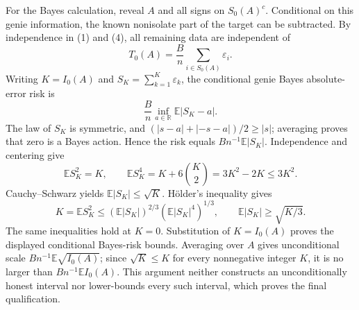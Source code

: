 For the Bayes calculation, reveal \(A\) and all signs on \(S_0(A)^c\).  Conditional on this genie information, the known nonisolate part of the target can be subtracted.  By independence in (1) and (4), all remaining data are independent of
\[
 T_0(A)=\frac Bn\sum_{i\in S_0(A)}\varepsilon_i.
\tag{6}
\]
Writing \(K=I_0(A)\) and \(S_K=\sum_{k=1}^K\varepsilon_k\), the conditional genie Bayes absolute-error risk is
\[
 \frac Bn\inf_{a\in\mathbb R}\mathbb E|S_K-a|.
\]
The law of \(S_K\) is symmetric, and \((|s-a|+|-s-a|)/2\geq|s|\); averaging proves that zero is a Bayes action.  Hence the risk equals \(Bn^{-1}\mathbb E|S_K|\).  Independence and centering give
\[
 \mathbb ES_K^2=K,
 \qquad \mathbb ES_K^4=K+6{K\choose2}=3K^2-2K\leq3K^2.
\tag{7}
\]
Cauchy--Schwarz yields \(\mathbb E|S_K|\leq\sqrt K\).  H\"older's inequality gives
\[
 K=\mathbb ES_K^2
 \leq(\mathbb E|S_K|)^{2/3}(\mathbb E|S_K|^4)^{1/3},
 \qquad \mathbb E|S_K|\geq\sqrt{K/3}.
\tag{8}
\]
The same inequalities hold at \(K=0\).  Substitution of \(K=I_0(A)\) proves the displayed conditional Bayes-risk bounds.  Averaging over \(A\) gives unconditional scale \(Bn^{-1}\mathbb E\sqrt{I_0(A)}\); since \(\sqrt K\leq K\) for every nonnegative integer \(K\), it is no larger than \(Bn^{-1}\mathbb EI_0(A)\).  This argument neither constructs an unconditionally honest interval nor lower-bounds every such interval, which proves the final qualification.
